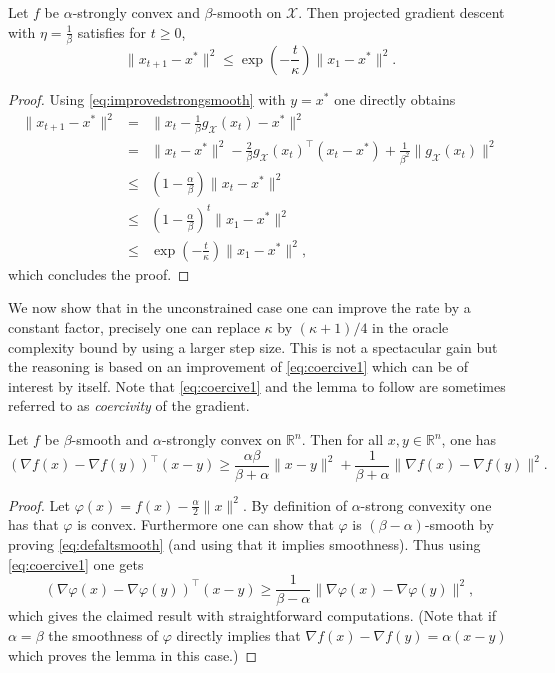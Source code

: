 \documentclass[openany]{now}
\renewcommand{\phi}{\varphi}
\newcommand{\R}{\mathbb{R}}
\newcommand{\cX}{\mathcal{X}}
\begin{document}
\begin{theorem} \label{th:gdssc}
Let $f$ be $\alpha$-strongly convex and $\beta$-smooth on $\cX$. Then projected gradient descent with $\eta = \frac{1}{\beta}$ satisfies for $t \geq 0$,
$$\|x_{t+1} - x^*\|^2 \leq \exp\left( - \frac{t}{\kappa} \right) \|x_1 - x^*\|^2 .$$
\end{theorem}

\begin{proof}
Using \eqref{eq:improvedstrongsmooth} with $y=x^*$ one directly obtains
\begin{eqnarray*}
\|x_{t+1} - x^*\|^2& = & \|x_{t} - \frac{1}{\beta} g_{\cX}(x_t) - x^*\|^2 \\
& = & \|x_{t} - x^*\|^2 - \frac{2}{\beta} g_{\cX}(x_t)^{\top} (x_t - x^*) + \frac{1}{\beta^2} \|g_{\cX}(x_t)\|^2 \\
& \leq & \left(1 - \frac{\alpha}{\beta} \right) \|x_{t} - x^*\|^2 \\
& \leq & \left(1 - \frac{\alpha}{\beta} \right)^t \|x_{1} - x^*\|^2 \\
& \leq & \exp\left( - \frac{t}{\kappa} \right) \|x_1 - x^*\|^2 ,
\end{eqnarray*}
which concludes the proof.
\end{proof}

We now show that in the unconstrained case one can improve the rate by a constant factor, precisely one can replace $\kappa$ by $(\kappa+1) / 4$ in the oracle complexity bound by using a larger step size. This is not a spectacular gain but the reasoning is based on an improvement of \eqref{eq:coercive1} which can be of interest by itself. Note that \eqref{eq:coercive1} and the lemma to follow are sometimes referred to as {\em coercivity} of the gradient.

\begin{lemma} \label{lem:coercive2}
Let $f$ be $\beta$-smooth and $\alpha$-strongly convex on $\R^n$. Then for all $x, y \in \mathbb{R}^n$, one has
$$(\nabla f(x) - \nabla f(y))^{\top} (x - y) \geq \frac{\alpha \beta}{\beta + \alpha} \|x-y\|^2 + \frac{1}{\beta + \alpha} \|\nabla f(x) - \nabla f(y)\|^2 .$$
\end{lemma}

\begin{proof}
Let $\phi(x) = f(x) - \frac{\alpha}{2} \|x\|^2$. By definition of $\alpha$-strong convexity one has that $\phi$ is convex. Furthermore one can show that $\phi$ is $(\beta-\alpha)$-smooth by proving \eqref{eq:defaltsmooth} (and using that it implies smoothness). Thus using \eqref{eq:coercive1} one gets
$$(\nabla \phi(x) - \nabla \phi(y))^{\top} (x - y) \geq \frac{1}{\beta - \alpha} \|\nabla \phi(x) - \nabla \phi(y)\|^2 ,$$
which gives the claimed result with straightforward computations. (Note that if $\alpha = \beta$ the smoothness of $\phi$ directly implies that $\nabla f(x) - \nabla f(y) = \alpha (x-y)$ which proves the lemma in this case.)
\end{proof}
\end{document}
